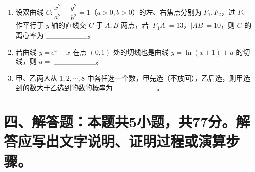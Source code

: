 \documentclass[12pt,a4paper]{article}
\begin{document}
\begin{enumerate}[label=\arabic*.]
\item 设双曲线 $C:\dfrac{x^2}{a^2}-\dfrac{y^2}{b^2}=1$（$a>0,b>0$）的左、右焦点分别为 $F_1,F_2$，过 $F_2$ 作平行于 $y$ 轴的直线交 $C$ 于 $A,B$ 两点，若 $|F_1A|=13$，$|AB|=10$，则 $C$ 的离心率为 \_\_\_\_\_\_\_\_。

\vspace{0.3cm}

\item 若曲线 $y=e^x+x$ 在点 $(0,1)$ 处的切线也是曲线 $y=\ln(x+1)+a$ 的切线，则 $a=$ \_\_\_\_\_\_\_\_。

\vspace{0.3cm}

\item 甲、乙两人从 $1,2,\cdots,8$ 中各任选一个数，甲先选（不放回），乙后选，则甲选到的数大于乙选到的数的概率为 \_\_\_\_\_\_\_\_。

\end{enumerate}

\section*{四、解答题：本题共5小题，共77分。解答应写出文字说明、证明过程或演算步骤。}
\end{document}

